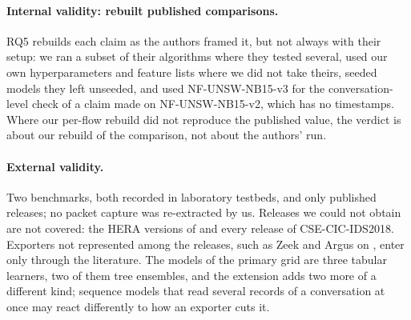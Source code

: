 \paragraph{Internal validity: rebuilt published comparisons.} RQ5 rebuilds each claim as the authors framed it, but not always with their setup: we ran a subset of their algorithms where they tested several, used our own hyperparameters and feature lists where we did not take theirs, seeded models they left unseeded, and used NF-UNSW-NB15-v3 for the conversation-level check of a claim made on NF-UNSW-NB15-v2, which has no timestamps. Where our per-flow rebuild did not reproduce the published value, the verdict is about our rebuild of the comparison, not about the authors' run.

\paragraph{External validity.} Two benchmarks, both recorded in laboratory testbeds, and only published releases; no packet capture was re-extracted by us. Releases we could not obtain are not covered: the HERA versions of \cicids{} and every release of CSE-CIC-IDS2018. Exporters not represented among the releases, such as Zeek and Argus on \cicids, enter only through the literature. The models of the primary grid are three tabular learners, two of them tree ensembles, and the extension adds two more of a different kind; sequence models that read several records of a conversation at once may react differently to how an exporter cuts it.

